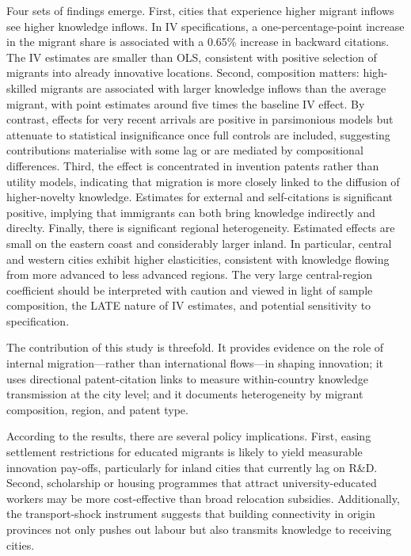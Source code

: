 \documentclass[12pt]{article}
\begin{document}
Four sets of findings emerge. First, cities that experience higher migrant inflows see higher knowledge inflows. In IV specifications, a one-percentage-point increase in the migrant share is associated with a 0.65\% increase in backward citations. The IV estimates are smaller than OLS, consistent with positive selection of migrants into already innovative locations. Second, composition matters: high-skilled migrants are associated with larger knowledge inflows than the average migrant, with point estimates around five times the baseline IV effect. By contrast, effects for very recent arrivals are positive in parsimonious models but attenuate to statistical insignificance once full controls are included, suggesting contributions materialise with some lag or are mediated by compositional differences. Third, the effect is concentrated in invention patents rather than utility models, indicating that migration is more closely linked to the diffusion of higher-novelty knowledge. Estimates for external and self-citations is significant positive, implying that immigrants can both bring knowledge indirectly and direclty. Finally, there is significant regional heterogeneity. Estimated effects are small on the eastern coast and considerably larger inland. In particular, central and western cities exhibit higher elasticities, consistent with knowledge flowing from more advanced to less advanced regions. The very large central-region coefficient should be interpreted with caution and viewed in light of sample composition, the LATE nature of IV estimates, and potential sensitivity to specification.

The contribution of this study is threefold. It provides evidence on the role of internal migration—rather than international flows—in shaping innovation; it uses directional patent-citation links to measure within-country knowledge transmission at the city level; and it documents heterogeneity by migrant composition, region, and patent type. 

According to the results, there are several policy implications. First, easing settlement restrictions for educated migrants is likely to yield measurable innovation pay-offs, particularly for inland cities that currently lag on R\&D. Second, scholarship or housing programmes that attract university-educated workers may be more cost-effective than broad relocation subsidies. Additionally, the transport-shock instrument suggests that building connectivity in origin provinces not only pushes out labour but also transmits knowledge to receiving cities.
\end{document}
